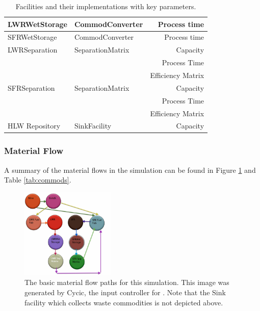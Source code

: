 \begin{table}
\begin{tabular}{|l|l|r|}
LWRWetStorage & CommodConverter & Process time\\
\hline
SFRWetStorage & CommodConverter & Process time\\
\hline
LWRSeparation & SeparationMatrix & Capacity\\
& & Process Time\\
& & Efficiency Matrix\\
\hline
SFRSeparation & SeparationMatrix & Capacity\\
& & Process Time\\
& & Efficiency Matrix\\
\hline
HLW Repository & SinkFacility & Capacity \\
\hline
\end{tabular}
\caption{Facilities and their implementations with key parameters.}
\label{tab:facimpl}
\end{table}

\subsubsection{Material Flow}
A summary of the material flows in the simulation can be found in Figure 
\ref{fig:cycic_img} and Table \ref{tab:commods}.

\begin{figure}[htpb]
\begin{center}
\includegraphics[width=0.4\textwidth]{cycic_img.eps}
\end{center}
\caption{The basic material flow paths for this simulation. This image was 
generated by Cycic, the input controller for \Cyclus 
\cite{flanagan_input_2013}. Note that the Sink facility which collects waste 
commodities is not depicted above.}
\label{fig:cycic_img}
\end{figure}

